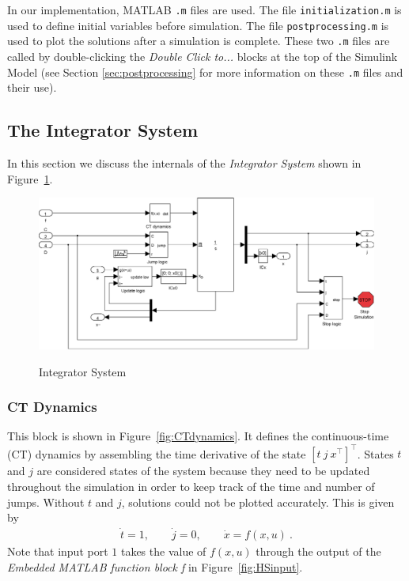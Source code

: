 \documentclass{article}
\begin{document}
In our implementation, MATLAB {\tt .m} files are used. The file {\tt initialization.m} is used to define initial variables before simulation. The file {\tt postprocessing.m} is used to plot the solutions after a simulation is complete. These two {\tt .m} files are called by double-clicking the {\em Double Click to...} blocks at the top of the Simulink Model (see Section \ref{sec:postprocessing} for more information on these {\tt .m} files and their use).


\subsection{The Integrator System}
\label{sec:integratorsystem}
In this section we discuss the internals of the {\em Integrator System} shown in Figure~\ref{fig:integratorsystem}.

\begin{figure}[ht]
  \begin{center}
    {\includegraphics[width=.95\textwidth]{figures/Simulink/Integrator.eps}}
   \caption{Integrator System}
\label{fig:integratorsystem}
  \end{center}
\end{figure}


\subsubsection{CT Dynamics}

This block is shown in Figure~\ref{fig:CTdynamics}. It defines the continuous-time (CT) dynamics by assembling the time derivative of the state $[t\ j\ x^\top]^\top$. States $t$ and $j$ are considered states of the system because they need to be updated throughout the simulation in order to keep track of the time and number of jumps. Without $t$ and $j$, solutions could not be plotted accurately.
This is given by
\begin{eqnarray*}
\dot{t} = 1, \qquad \dot{j} = 0, \qquad \dot{x} = f(x,u)\ .
\end{eqnarray*}
Note that input port $1$ takes the value of $f(x,u)$ through the output of the
{\em Embedded MATLAB function block f} in Figure~\ref{fig:HSinput}.
\end{document}
